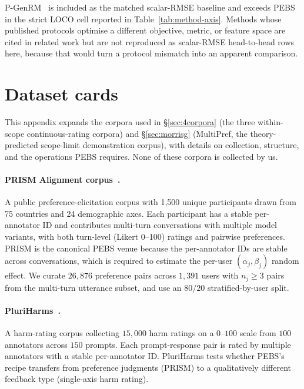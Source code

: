 \documentclass{article}
\newcommand{\PEBS}{\textsc{PEBS}}
\begin{document}
P-GenRM~\citep{pgenrm2026} is included as the matched scalar-RMSE
baseline and exceeds \PEBS{} in the strict LOCO cell reported in
Table~\ref{tab:method-axis}.
Methods whose published protocols optimise a different objective,
metric, or feature space are cited in related work but are not
reproduced as scalar-RMSE head-to-head rows here, because that
would turn a protocol mismatch into an apparent comparison.

\section{Dataset cards}
\label{app:datasets}

This appendix expands the corpora used in
\S\ref{sec:4corpora} (the three within-scope continuous-rating
corpora) and \S\ref{sec:morrisg} (MultiPref, the
theory-predicted scope-limit demonstration corpus), with details
on collection, structure, and the operations PEBS requires. None
of these corpora is collected by us.

\paragraph{PRISM Alignment corpus~\citep{kirk2024prism}.}
A public preference-elicitation corpus with 1{,}500 unique
participants drawn from 75 countries and 24 demographic axes.
Each participant has a stable per-annotator ID and contributes
multi-turn conversations with multiple model variants, with both
turn-level (Likert 0--100) ratings and pairwise preferences. PRISM
is the canonical PEBS venue because the per-annotator IDs are
stable across conversations, which is required to estimate the
per-user $(\alpha_j, \beta_j)$ random effect. We curate
$26{,}876$ preference pairs across $1{,}391$ users with
$n_j \ge 3$ pairs from the multi-turn utterance subset, and use
an $80/20$ stratified-by-user split.

\paragraph{PluriHarms~\citep{li2026pluriharms}.}
A harm-rating corpus collecting $15{,}000$ harm ratings on a
$0$--$100$ scale from $100$ annotators across $150$ prompts. Each
prompt-response pair is rated by multiple annotators with a stable
per-annotator ID. PluriHarms tests whether PEBS's recipe transfers
from preference judgments (PRISM) to a qualitatively different
feedback type (single-axis harm rating).
\end{document}

